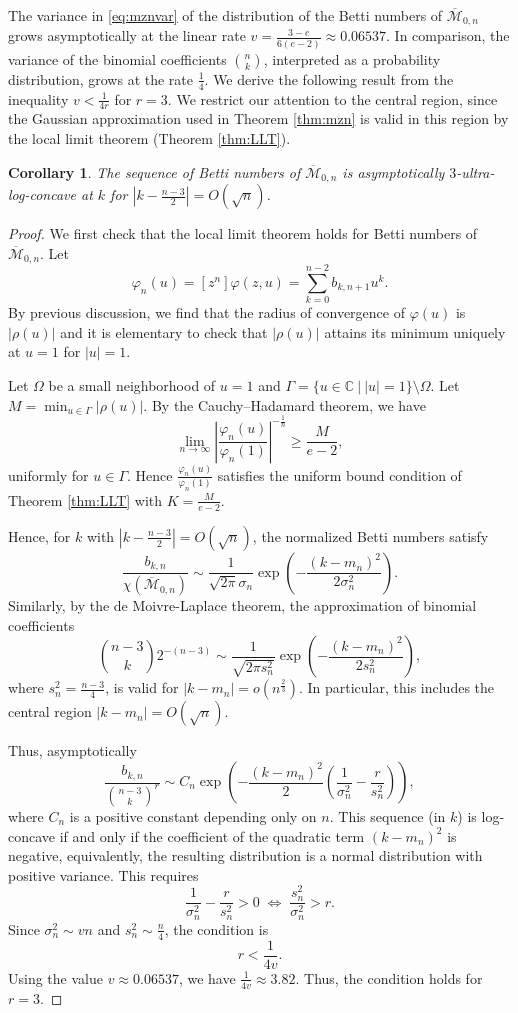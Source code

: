 \documentclass[11pt,letterpaper]{amsart}
\numberwithin{equation}{section}
\newtheorem{corollary}[theorem]{Corollary}
\theoremstyle{definition}
\def\CC{\mathbb{C}}
\newcommand{\cal}{\mathcal}
\def\cM{{\cal M}}
\def\mzn{\overline{\cM}_{0,n} }
\def\beq{\begin{equation}}
\def\eeq{\end{equation}}
\begin{document}
The variance in \eqref{eq:mznvar} of the distribution of the Betti numbers of $\mzn$ grows asymptotically at the linear rate $v= \frac{3-e}{6(e-2)} \approx 0.06537$. In comparison, the variance of the binomial coefficients $\binom{n}{k}$, interpreted as a probability distribution, grows at the rate $\frac{1}{4}$.
We derive the following result from the inequality $v < \frac{1}{4r}$ for $r=3$. We restrict our attention to the central region, since the Gaussian approximation used in Theorem \ref{thm:mzn} is valid in this region by the local limit theorem (Theorem \ref{thm:LLT}).

\begin{corollary}
  The sequence of Betti numbers of $\mzn$ is asymptotically $3$-ultra-log-concave at $k$ for $|k-\frac{n-3}{2}|=O(\sqrt{n})$.
\end{corollary}
\begin{proof}
  We first check that the local limit theorem holds for Betti numbers of $\mzn$. Let \[\varphi_n(u)=[z^{n}]\varphi(z, u)=\sum_{k=0}^{n-2}b_{k, n+1} u^k.\] By previous discussion, we find that the radius of convergence of $\varphi(u)$ is $|\rho(u)|$ and it is elementary to check that $|\rho(u)|$ attains its minimum uniquely at $u=1$ for $|u|=1$. 
  
  Let $\Omega$ be a small neighborhood of $u=1$ and $\Gamma=\{u\in \CC ~|~ |u|=1\}\setminus\Omega$. Let $M=\min_{u\in \Gamma}|\rho(u)|$. By the Cauchy–Hadamard theorem, we have \[ \lim_{n\to \infty} \left|\frac{\varphi_n(u)}{\varphi_n(1)}\right|^{-\frac{1}{n}} \ge \frac{M}{e-2}, \]
  uniformly for $u \in \Gamma$. Hence $\frac{\varphi_n(u)}{\varphi_n(1)}$ satisfies the uniform bound condition of Theorem \ref{thm:LLT} with $K=\frac{M}{e-2}$.

  Hence, for $k$ with $|k-\frac{n-3}{2}|=O(\sqrt{n})$, the normalized Betti numbers satisfy
  \beq\label{eq:bettiasymp} \frac{b_{k,n}}{\chi(\mzn)} \sim \frac{1}{\sqrt{2\pi}\sigma_n} \exp\left({-\frac{(k-m_n)^2}{2\sigma_n^2}}\right). \eeq
  Similarly, by the de Moivre-Laplace theorem, the approximation of binomial coefficients
  \[ \binom{n-3}{k} 2^{-(n-3)} \sim \frac{1}{\sqrt{2\pi s_n^2}} \exp\left({-\frac{(k-m_n)^2}{2 s_n^2}}\right), \]
  where $s_n^2 = \frac{n-3}{4}$, is valid for $|k-m_n|=o(n^{\frac{2}{3}})$. In particular, this includes the central region $|k-m_n|=O(\sqrt{n})$.

  Thus, asymptotically
  \[  \frac{b_{k,n}}{\binom{n-3}{k}^r} \sim C_n \exp\left( -\frac{(k-m_n)^2}{2} \left( \frac{1}{\sigma_n^2}-\frac{r}{s_n^2} \right) \right), \]
 where $C_n$ is a positive constant depending only on $n$. This sequence (in $k$) is log-concave if and only if the coefficient of the quadratic term $(k-m_n)^2$ is negative, equivalently, the resulting distribution is a normal distribution with positive variance. This requires
  \[ \frac{1}{\sigma_n^2} - \frac{r}{s_n^2} > 0 \;\Leftrightarrow \; \frac{s_n^2}{\sigma_n^2} > r. \]
 Since $\sigma_n^2 \sim vn$ and $s_n^2 \sim \frac{n}{4}$, the condition is $$r < \frac{1}{4v}.$$ Using the value $v \approx 0.06537$, we have $\frac{1}{4v} \approx 3.82$. Thus, the condition holds for $r=3$.
\end{proof}
\end{document}
